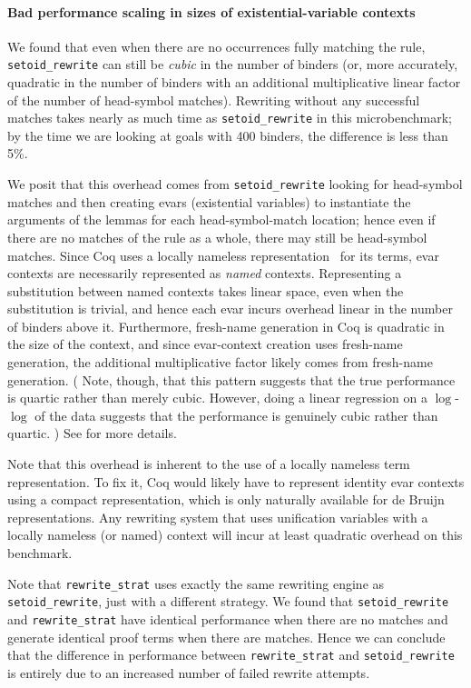\paragraph{Bad performance scaling in sizes of existential-variable contexts}

We found that even when there are no occurrences fully matching the rule, \texttt{setoid_rewrite} can still be \emph{cubic} in the number of binders (or, more accurately, quadratic in the number of binders with an additional multiplicative linear factor of the number of head-symbol matches).
Rewriting without any successful matches takes nearly as much time as \texttt{setoid_rewrite} in this microbenchmark; by the time we are looking at goals with 400 binders, the difference is less than 5\%.

We posit that this overhead comes from \texttt{setoid_rewrite} looking for head-symbol matches and then creating evars (existential variables) to instantiate the arguments of the lemmas for each head-symbol-match location; hence even if there are no matches of the rule as a whole, there may still be head-symbol matches.
Since Coq uses a locally nameless representation~\cite{Engineering2008Aydemir} for its terms, evar contexts are necessarily represented as \emph{named} contexts.
Representing a substitution between named contexts takes linear space, even when the substitution is trivial, and hence each evar incurs overhead linear in the number of binders above it.
Furthermore, fresh-name generation in Coq is quadratic in the size of the context, and since evar-context creation uses fresh-name generation, the additional multiplicative factor likely comes from fresh-name generation.
(%
Note, though, that this pattern suggests that the true performance is quartic rather than merely cubic.
However, doing a linear regression on a $\log$-$\log$ of the data suggests that the performance is genuinely cubic rather than quartic.%
)
See  for more details.

Note that this overhead is inherent to the use of a locally nameless term representation.
To fix it, Coq would likely have to represent identity evar contexts using a compact representation, which is only naturally available for de Bruijn representations.
Any rewriting system that uses unification variables with a locally nameless (or named) context will incur at least quadratic overhead on this benchmark.

Note that \texttt{rewrite_strat} uses exactly the same rewriting engine as \texttt{setoid_rewrite}, just with a different strategy.
We found that \texttt{setoid_rewrite} and \texttt{rewrite_strat} have identical performance when there are no matches and generate identical proof terms when there are matches.
Hence we can conclude that the difference in performance between \texttt{rewrite_strat} and \texttt{setoid_rewrite} is entirely due to an increased number of failed rewrite attempts.

